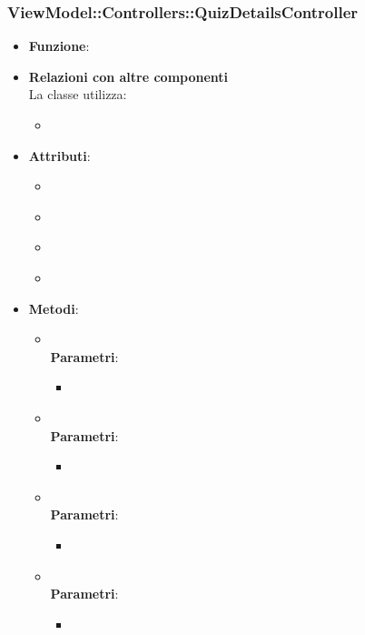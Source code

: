 \subsubsection{ViewModel::Controllers::QuizDetailsController}\begin{itemize}
\item\textbf{Funzione}:
\item\textbf{Relazioni con altre componenti}\\
La classe utilizza:
	\begin{itemize}
		\item
	\end{itemize}
\item\textbf{Attributi}:
	\begin{itemize}
		\item\code{}\\
		\item\code{}\\
		\item\code{}\\
		\item\code{}\\
	\end{itemize}
\item\textbf{Metodi}:
	\begin{itemize}
		\item\code{}\\
		\textbf{Parametri}:
			\begin{itemize}
				\item\code{}\\
			\end{itemize}
		\item\code{}\\
		\textbf{Parametri}:
			\begin{itemize}
				\item\code{}\\
			\end{itemize}
		\item\code{}\\
		\textbf{Parametri}:
			\begin{itemize}
				\item\code{}\\
			\end{itemize}
		\item\code{}\\
		\textbf{Parametri}:
			\begin{itemize}
				\item\code{}\\
			\end{itemize}
	\end{itemize}
\end{itemize}


